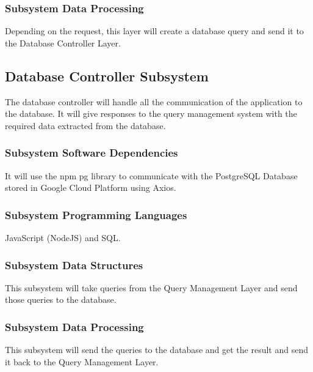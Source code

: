 \subsubsection{Subsystem Data Processing}
Depending on the request, this layer will create a database query and send it to the Database Controller Layer.

\subsection{Database Controller Subsystem}
The database controller will handle all the communication of the application to the database. It will
give responses to the query management system with the required data extracted from the database.



\subsubsection{Subsystem Software Dependencies}
It will use the npm pg library to communicate with the PostgreSQL Database stored in Google Cloud Platform using Axios.

\subsubsection{Subsystem Programming Languages}
JavaScript (NodeJS) and SQL.

\subsubsection{Subsystem Data Structures}
This subsystem will take queries from the Query Management Layer and send those queries to the database.

\subsubsection{Subsystem Data Processing}
This subsystem will send the queries to the database and get the result and send it back to the Query Management Layer.